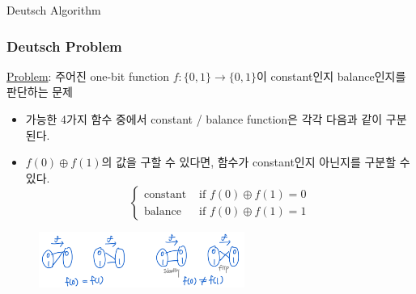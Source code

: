 \documentclass[9pt]{beamer}
\begin{document}
    \begin{section}{Deutsch Algorithm}
        \begin{frame}
            \frametitle{Deutsch Problem}
            \underline{Problem}: 주어진 one-bit function $f: \{0, 1\} \rightarrow \{0, 1\}$이 constant인지 balance인지를 판단하는 문제
            \vspace{0.2cm}
            \begin{itemize}
                \item 가능한 4가지 함수 중에서 constant / balance function은 각각 다음과 같이 구분된다.
                \item $f(0) \oplus f(1)$의 값을 구할 수 있다면, 함수가 constant인지 아닌지를 구분할 수 있다.
                $$ \begin{cases} \text{constant} & \text{ if } f(0)\oplus f(1) = 0  \\ \text{balance} & \text{ if } f(0)\oplus f(1) = 1 \end{cases}$$
            \end{itemize}
            \begin{figure}
                \includegraphics[width=0.6\textwidth]{image/L2_Deutsh.png}
            \end{figure}
        \end{frame}


\end{section}
\end{document}
